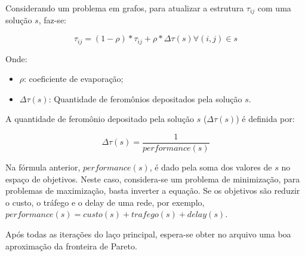 Considerando um problema em grafos, para atualizar a estrutura $\tau_{ij}$ com uma solução $s$, faz-se:

\[\tau_{ij} = (1 - \rho) * \tau_{ij} + \rho * \Delta\tau(s) \forall(i,j) \in s\]

Onde:
\begin{itemize} 
	\item $\rho$: coeficiente de evaporação;
	\item $\Delta\tau(s)$: Quantidade de feromônios depositados pela solução $s$.
\end{itemize}

A quantidade de feromônio depositado pela solução $s$ ($\Delta\tau(s)$) é definida por:

\[\Delta\tau(s) = \frac{1}{performance(s)}\]

Na fórmula anterior, $performance(s)$, é dado pela soma dos valores de $s$ no espaço de objetivos. Neste caso, considera-se um problema de minimização, para problemas de maximização, basta inverter a equação. Se os objetivos são reduzir o custo, o tráfego e o delay de uma rede, por exemplo, $performance(s) = custo(s) + trafego(s) + delay(s)$.

Após todas as iterações do laço principal, espera-se obter no arquivo uma boa aproximação da fronteira de Pareto. 
